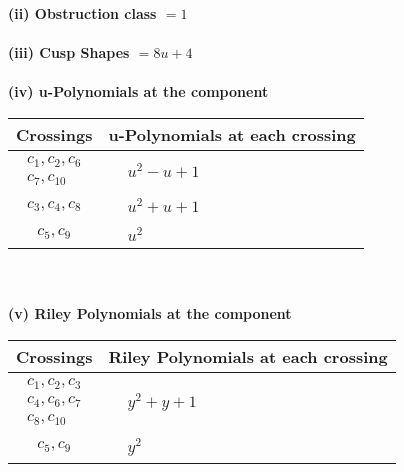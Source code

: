 \documentclass[1p]{elsarticle_modified}
\theoremstyle{definition}
\begin{document}
\flushleft \textbf{(ii) Obstruction class $= 1$}\\~\\
\flushleft \textbf{(iii) Cusp Shapes $= 8 u+4$}\\~\\
\newpage\renewcommand{\arraystretch}{1}
\flushleft \textbf{(iv) u-Polynomials at the component}\newline \\
\begin{tabular}{m{50pt}|m{274pt}}
Crossings & \hspace{64pt}u-Polynomials at each crossing \\
\hline $$\begin{aligned}c_{1},c_{2},c_{6}\\c_{7},c_{10}\end{aligned}$$&$\begin{aligned}
&u^2- u+1
\end{aligned}$\\
\hline $$\begin{aligned}c_{3},c_{4},c_{8}\end{aligned}$$&$\begin{aligned}
&u^2+u+1
\end{aligned}$\\
\hline $$\begin{aligned}c_{5},c_{9}\end{aligned}$$&$\begin{aligned}
&u^2
\end{aligned}$\\
\hline
\end{tabular}\\~\\
\newpage\renewcommand{\arraystretch}{1}
\flushleft \textbf{(v) Riley Polynomials at the component}\newline \\
\begin{tabular}{m{50pt}|m{274pt}}
Crossings & \hspace{64pt}Riley Polynomials at each crossing \\
\hline $$\begin{aligned}c_{1},c_{2},c_{3}\\c_{4},c_{6},c_{7}\\c_{8},c_{10}\end{aligned}$$&$\begin{aligned}
&y^2+y+1
\end{aligned}$\\
\hline $$\begin{aligned}c_{5},c_{9}\end{aligned}$$&$\begin{aligned}
&y^2
\end{aligned}$\\
\hline
\end{tabular}\\~\\
\end{document}
